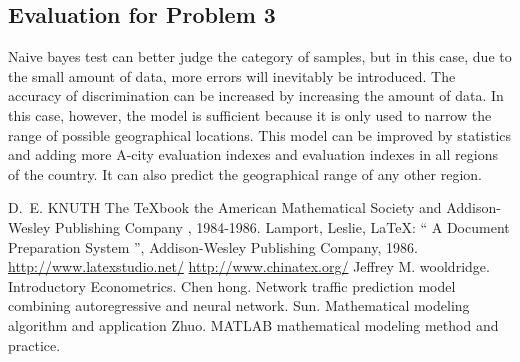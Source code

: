 \documentclass{mcmthesis}
\begin{document}
\subsection{Evaluation for Problem 3}
Naive bayes test can better judge the category of samples, but in this case, due to the small amount of data, more errors will inevitably be introduced. The accuracy of discrimination can be increased by increasing the amount of data. In this case, however, the model is sufficient because it is only used to narrow the range of possible geographical locations. This model can be improved by statistics and adding more A-city evaluation indexes and evaluation indexes in all regions of the country. It can also predict the geographical range of any other region.

\begin{thebibliography}{99}
 D.~E. KNUTH   The \TeX{}book  the American
Mathematical Society and Addison-Wesley
Publishing Company , 1984-1986.
Lamport, Leslie,  \LaTeX{}: `` A Document Preparation System '',
Addison-Wesley Publishing Company, 1986.
\url{http://www.latexstudio.net/}
\url{http://www.chinatex.org/}
 Jeffrey M. wooldridge. Introductory Econometrics.
 Chen hong. Network traffic prediction model combining autoregressive and neural network.
 Sun. Mathematical modeling algorithm and application
 Zhuo. MATLAB mathematical modeling method and practice.
\end{thebibliography}
\end{document}
